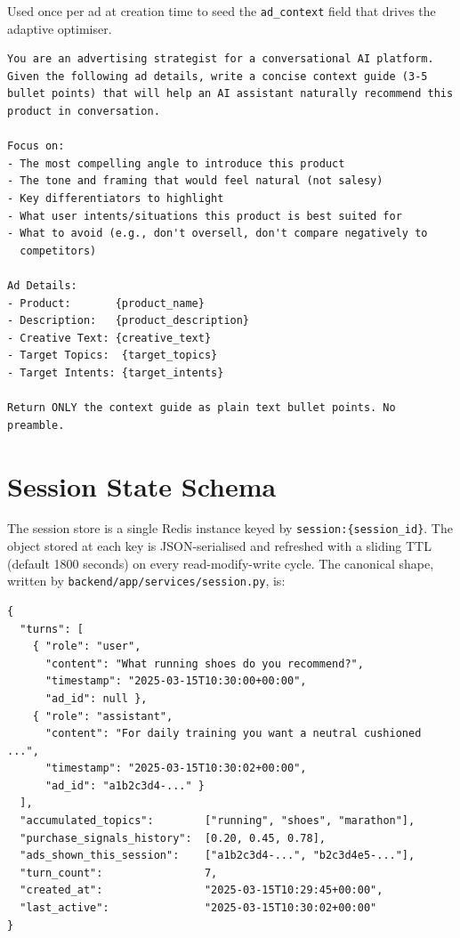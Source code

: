 \begin{appendices}
Used once per ad at creation time to seed the
\texttt{ad\_context} field that drives the adaptive optimiser.

\begin{lstlisting}[style=promptstyle, caption={Initial ad-context prompt
    (\texttt{real\_generate\_initial\_context}).}]
You are an advertising strategist for a conversational AI platform.
Given the following ad details, write a concise context guide (3-5
bullet points) that will help an AI assistant naturally recommend this
product in conversation.

Focus on:
- The most compelling angle to introduce this product
- The tone and framing that would feel natural (not salesy)
- Key differentiators to highlight
- What user intents/situations this product is best suited for
- What to avoid (e.g., don't oversell, don't compare negatively to
  competitors)

Ad Details:
- Product:       {product_name}
- Description:   {product_description}
- Creative Text: {creative_text}
- Target Topics:  {target_topics}
- Target Intents: {target_intents}

Return ONLY the context guide as plain text bullet points. No preamble.
\end{lstlisting}



\section{Session State Schema}
\label{app:session-schema}

The session store is a single Redis instance keyed by
\texttt{session:\{session\_id\}}. The object stored at each key is
JSON-serialised and refreshed with a sliding TTL (default 1800
seconds) on every read-modify-write cycle. The canonical shape,
written by \texttt{backend/app/services/session.py}, is:

\begin{lstlisting}[style=jsonstyle, caption={Redis session object.}]
{
  "turns": [
    { "role": "user",
      "content": "What running shoes do you recommend?",
      "timestamp": "2025-03-15T10:30:00+00:00",
      "ad_id": null },
    { "role": "assistant",
      "content": "For daily training you want a neutral cushioned ...",
      "timestamp": "2025-03-15T10:30:02+00:00",
      "ad_id": "a1b2c3d4-..." }
  ],
  "accumulated_topics":        ["running", "shoes", "marathon"],
  "purchase_signals_history":  [0.20, 0.45, 0.78],
  "ads_shown_this_session":    ["a1b2c3d4-...", "b2c3d4e5-..."],
  "turn_count":                7,
  "created_at":                "2025-03-15T10:29:45+00:00",
  "last_active":               "2025-03-15T10:30:02+00:00"
}
\end{lstlisting}


\end{appendices}
